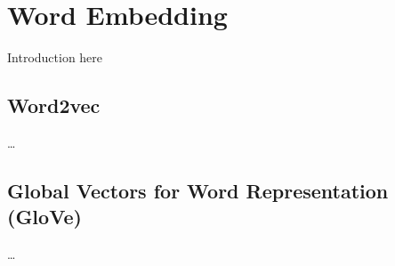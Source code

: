 \chapter{Word Embedding}
Introduction here

\section{Word2vec}
\dots

\section{Global Vectors for Word Representation (GloVe)}
\dots